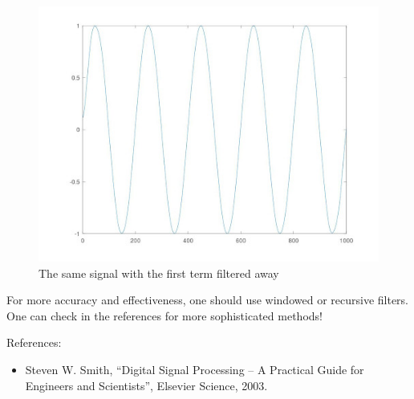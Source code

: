 \documentclass{article}
\begin{document}
\begin{figure}
  \includegraphics[width=\linewidth]{filtered.jpg}
  \caption{The same signal with the first term filtered away}
\end{figure}





For more accuracy and effectiveness, one should use windowed or recursive filters. One can check in the references for more sophisticated methods!


References:
\begin{itemize}
\item Steven W. Smith, ``Digital Signal Processing – A Practical Guide for Engineers and Scientists'', Elsevier Science, 2003.
\end{itemize}



\end{document}
